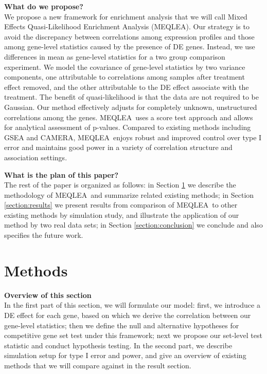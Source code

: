 \documentclass[useAMS,usenatbib, galley]{biom}
\newcommand{\OurMethod}{MEQLEA}
\begin{document}
	
	
	\textbf{What do we propose?} \\
	We propose a new framework for enrichment analysis that we will call Mixed Effects Quasi-Likelihood Enrichment Analysis (\OurMethod). Our strategy is to avoid the discrepancy between correlations among expression profiles and those among gene-level statistics caused by the presence of DE genes. Instead, we use differences in mean as gene-level statistics for a two group comparison experiment. We model the covariance of gene-level statistics by two variance components, one attributable to correlations among samples after treatment effect removed, and the other attributable to the DE effect associate with the treatment. The benefit of quasi-likelihood is that the data are not required to be Gaussian. Our method effectively adjusts for completely unknown, unstructured correlations among the genes. \OurMethod~uses a score test approach and allows for analytical assessment of p-values. Compared to existing methods including GSEA and CAMERA, \OurMethod~enjoys robust and improved control over type I error and maintains good power in a variety of correlation structure and association settings. 
	
	\textbf{What is the plan of this paper?} \\
	The rest of the paper is organized as follows: in Section \ref{section:methods} we describe the methodology of \OurMethod~and summarize related existing methods; in Section \ref{section:results} we present results from comparison of \OurMethod~to other existing methods by simulation study, and illustrate the application of our method by two real data sets; in Section \ref{section:conclusion} we conclude and also specifies the future work.

	
	\section{Methods}\label{section:methods}
	\textbf{Overview of this section} \\
	In the first part of this section, we will formulate our model: first, we introduce a DE effect for each gene, based on which we derive the correlation between our gene-level statistics; then we define the null and alternative hypotheses for competitive gene set test under this framework; next we propose our set-level test statistic and conduct hypothesis testing. In the second part, we describe simulation setup for type I error and power, and give an overview of existing methods that we will compare against in the result section.  
	
\end{document}
